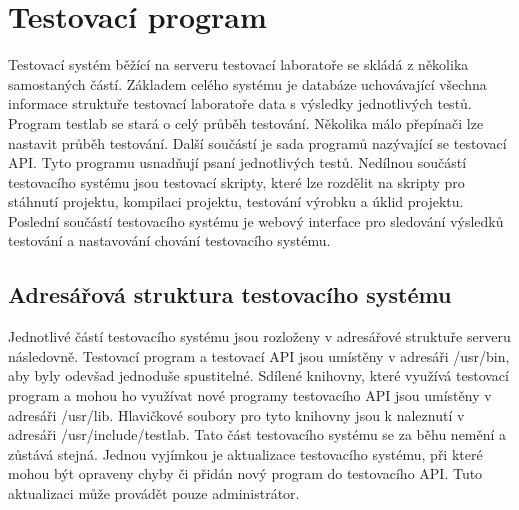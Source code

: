 \chapter{Testovací program}
Testovací systém běžící na serveru testovací laboratoře se skládá z několika samostaných částí. Základem celého systému je databáze uchovávající všechna informace struktuře testovací laboratoře data s výsledky jednotlivých testů. Program testlab se stará o celý průběh testování. Několika málo přepínači lze nastavit průběh testování. Další součástí je sada programů nazývající se testovací API. Tyto programu usnadňují psaní jednotlivých testů. Nedílnou součástí testovacího systému jsou testovací skripty, které lze rozdělit na skripty pro stáhnutí projektu, kompilaci projektu, testování výrobku a úklid projektu. Poslední součástí testovacího systému je webový interface pro sledování výsledků testování a nastavování chování testovacího systému.

\section{Adresářová struktura testovacího systému}

Jednotlivé částí testovacího systému jsou rozloženy v adresářové struktuře serveru následovně. Testovací program a testovací API jsou umístěny v adresáři /usr/bin, aby byly odevšad jednoduše spustitelné. Sdílené knihovny, které využívá testovací program a mohou ho využívat nové programy testovacího API jsou umístěny v adresáři /usr/lib. Hlavičkové soubory pro tyto knihovny jsou k naleznutí v adresáři /usr/include/testlab. Tato část testovacího systému se za běhu nemění a zůstává stejná. Jednou vyjímkou je aktualizace testovacího systému, při které mohou být opraveny chyby či přidán nový program do testovacího API. Tuto aktualizaci může provádět pouze administrátor.

